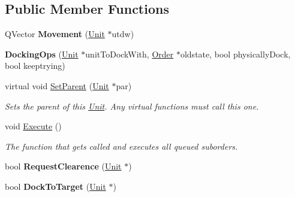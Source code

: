 \subsection*{Public Member Functions}
\begin{DoxyCompactItemize}
\item 
Q\+Vector {\bfseries Movement} (\hyperlink{classUnit}{Unit} $\ast$utdw)\hypertarget{classOrders_1_1DockingOps_a172b851c51f5d09c00823c6a32300956}{}\label{classOrders_1_1DockingOps_a172b851c51f5d09c00823c6a32300956}

\item 
{\bfseries Docking\+Ops} (\hyperlink{classUnit}{Unit} $\ast$unit\+To\+Dock\+With, \hyperlink{classOrder}{Order} $\ast$oldstate, bool physically\+Dock, bool keeptrying)\hypertarget{classOrders_1_1DockingOps_a342ab326114f62ab8797672c457d2173}{}\label{classOrders_1_1DockingOps_a342ab326114f62ab8797672c457d2173}

\item 
virtual void \hyperlink{classOrders_1_1DockingOps_a4b192de706e5ee7d251efdb7630ebc86}{Set\+Parent} (\hyperlink{classUnit}{Unit} $\ast$par)\hypertarget{classOrders_1_1DockingOps_a4b192de706e5ee7d251efdb7630ebc86}{}\label{classOrders_1_1DockingOps_a4b192de706e5ee7d251efdb7630ebc86}

\begin{DoxyCompactList}\small\item\em Sets the parent of this \hyperlink{classUnit}{Unit}. Any virtual functions must call this one. \end{DoxyCompactList}\item 
void \hyperlink{classOrders_1_1DockingOps_a3c520293b417dbf2d9b97f685cb59f93}{Execute} ()\hypertarget{classOrders_1_1DockingOps_a3c520293b417dbf2d9b97f685cb59f93}{}\label{classOrders_1_1DockingOps_a3c520293b417dbf2d9b97f685cb59f93}

\begin{DoxyCompactList}\small\item\em The function that gets called and executes all queued suborders. \end{DoxyCompactList}\item 
bool {\bfseries Request\+Clearence} (\hyperlink{classUnit}{Unit} $\ast$)\hypertarget{classOrders_1_1DockingOps_a2cb0c040e51f21653e0ede836ce2cd72}{}\label{classOrders_1_1DockingOps_a2cb0c040e51f21653e0ede836ce2cd72}

\item 
bool {\bfseries Dock\+To\+Target} (\hyperlink{classUnit}{Unit} $\ast$)\hypertarget{classOrders_1_1DockingOps_a02d8c94db38d907473e07b295c6d587a}{}\label{classOrders_1_1DockingOps_a02d8c94db38d907473e07b295c6d587a}


\end{DoxyCompactItemize}
